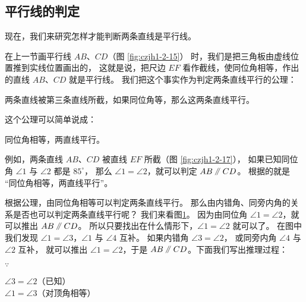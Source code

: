 \subsection{平行线的判定}\label{subsec:czjh1-2-6}

现在，我们来研究怎样才能判断两条直线是平行线。

在上一节画平行线 $AB$、$CD$（图 \ref{fig:czjh1-2-15}） 时，我们是把三角板由虚线位置推到实线位置画出的，
这就是说，把尺边 $EF$ 看作截线，使同位角相等，作出的直线 $AB$、$CD$ 就是平行线。
我们把这个事实作为判定两条直线平行的公理：

\begin{gongli}[公理]
    两条直线被第三条直线所截，如果同位角等，那么这两条直线平行。
\end{gongli}

这个公理可以简单说成：\begin{gongli}
    同位角相等，两直线平行。
\end{gongli}

例如，两条直线 $AB$、$CD$ 被直线 $EF$ 所截（图 \ref{fig:czjh1-2-17}），
如果已知同位角 $\angle 1$ 与 $\angle 2$ 都是 $85^\circ$，
那么 $\angle 1 = \angle 2$，就可以判定 $AB \pingxing CD$。
根据的就是 “同位角相等，两直线平行”。

\begin{figure}[htbp]
    \centering
    \begin{minipage}[b]{7cm}
        \centering
        
        \caption{}\label{fig:czjh1-2-17}
    \end{minipage}
    \qquad
    \begin{minipage}[b]{7cm}
        \centering
        
        \caption{}\label{fig:czjh1-2-18}
    \end{minipage}
\end{figure}


根据公理，由同位角相等可以判定两条直线平行。
那么由内错角、同旁内角的关系是否也可以判定两条直线平行呢？
我们来看图\ref{fig:czjh1-2-18}。 因为由同位角 $\angle 1 = \angle 2$，就可以推出 $AB \pingxing CD$。
所以只要找出在什么情形下，$\angle 1 = \angle 2$ 就可以了。
在图中我们发现 $\angle 1 = \angle 3$，$\angle 1$ 与 $\angle 4$ 互补。
如果内错角 $\angle 3 = \angle 2$， 或同旁内角 $\angle 4$ 与 $\angle 2$ 互补，
就可以推出 $\angle 1 = \angle 2$，于是 $AB \pingxing CD$。下面我们写出推理过程：

$\because$ \quad \begin{zmtblr}[t]{}
    $\angle 3 = \angle 2$（已知）\\
    $\angle 1 = \angle 3$（对顶角相等）
\end{zmtblr}

